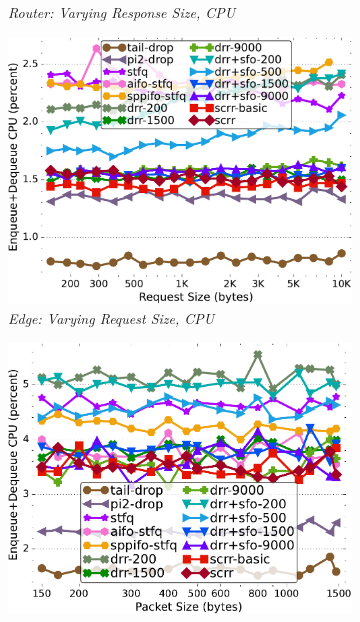 \begin{figure}[th!]
\begin{subfigure}[t]{.30\linewidth}
    \caption{\small{\textit{Router: Varying Response Size, CPU}}}
    \label{fig:reply-1456-cpu-full}
  \end{subfigure}
  \begin{subfigure}[t]{.30\linewidth}
    \centering
    \includegraphics[width=0.95\linewidth]{figs/pkt_size_edge_cn_2t1x32_mn_2tb1x8_mss_1468_kp_comp_methods.pdf}
    \caption{\small{\textit{Edge: Varying Request Size, CPU}}}
    \label{fig:request-edge-1456-cpu-full}
  \end{subfigure}
  \begin{subfigure}[t]{.30\linewidth}
    \centering
    \includegraphics[width=0.95\linewidth]{figs/pkt_size_cn_2t4x16_mn_2ui32_mss_1468_kp_comp_methods.pdf}

\end{subfigure}
\end{figure}
